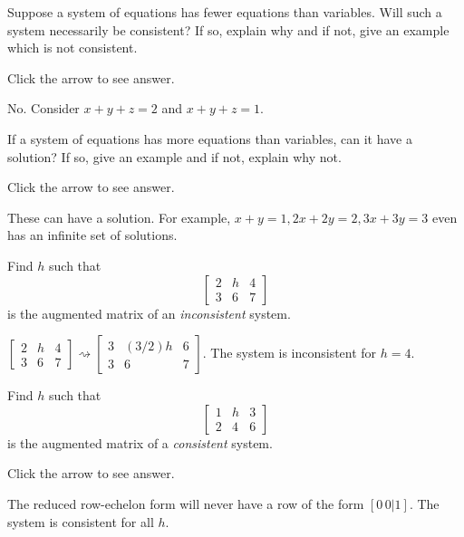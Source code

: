 \documentclass{ximera}
\begin{document}
\begin{problem}\label{prb:2.8}
Suppose a system of equations has fewer equations than variables. Will such a system necessarily be consistent? If so, explain why and if not, give an example which is not consistent.

Click the arrow to see answer.
\begin{expandable}{}{}
No. Consider $x+y+z=2$ and $x+y+z=1.$
\end{expandable}
\end{problem}

\begin{problem}\label{prb:2.9}
If a system of equations has more equations than variables, can it
have a solution? If so, give an example and if not, explain why not.

Click the arrow to see answer. 
\begin{expandable}{}{}
These can
have a solution. For example, $x+y=1,2x+2y=2,3x+3y=3$ even has an infinite
set of solutions.
\end{expandable}
\end{problem}

\begin{problem}\label{prb:2.10}
Find $h$ such that
\begin{equation*}
\left[
\begin{array}{rr|r}
2 & h & 4 \\
3 & 6 & 7
\end{array}
\right]
\end{equation*}
is the augmented matrix of an \textit{inconsistent} system.

\begin{expandable}{}{}
 $\left[
\begin{array}{cc|c}
2 & h & 4 \\
3 & 6 & 7
\end{array}
\right]\rightsquigarrow \left[
\begin{array}{cc|c}
3 & (3/2)h & 6 \\
3 & 6 & 7
\end{array}
\right]$.  The system is inconsistent for $h=4$.
\end{expandable}

\end{problem}

\begin{problem}\label{prb:2.11}
Find $h$ such that
\begin{equation*}
\left[
\begin{array}{rr|r}
1 & h & 3 \\
2 & 4 & 6
\end{array}
\right]
\end{equation*}
is the augmented matrix of a \textit{consistent} system.

Click the arrow to see answer. 
\begin{expandable}{}{}
 The reduced row-echelon form will never have a row of the form $[0\, 0|1]$. The system is consistent for all $h$.
\end{expandable}
\end{problem}
\end{document}
